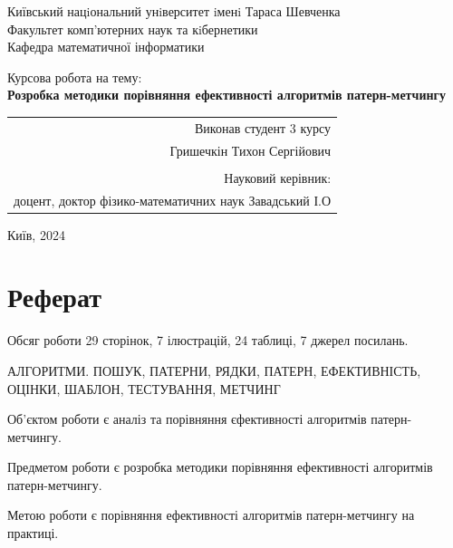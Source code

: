 \documentclass[a4paper,14pt]{extarticle} %
\begin{document}
	

    \begin{titlepage}
        \centering
        \large
        Київський нацiональний унiверситет iменi Тараса Шевченка\\
        Факультет комп’ютерних наук та кiбернетики\\
        Кафедра математичної інформатики\\
        
        \vspace*{4cm}
        
        \huge Курсова робота на тему: \\
            \textbf{Розробка методики порівняння ефективності алгоритмів патерн-метчингу}
        
        \vspace{4cm}
        
        \raggedleft
        \large
        \begin{tabular}{r}
            Виконав студент 3 курсу \\
            Гришечкін Тихон Сергійович \\
            \\
            Науковий керівник: \\
            доцент, доктор фізико-математичних наук Завадський І.О \\
        \end{tabular}
        
        \vfill
        
        \centering
        \large
        Київ, 2024
        
    \end{titlepage}

	
	\newpage

	\section*{Реферат}

	Обсяг роботи 29 сторінок, 7 ілюстрацій, 24 таблиці, 7 джерел посилань.

	АЛГОРИТМИ. ПОШУК, ПАТЕРНИ, РЯДКИ, ПАТЕРН,
	ЕФЕКТИВНІСТЬ, ОЦІНКИ, ШАБЛОН, ТЕСТУВАННЯ, МЕТЧИНГ

	Об'єктом роботи є аналіз та порівняння єфективності алгоритмів патерн-метчингу.
	
	Предметом роботи є розробка методики порівняння ефективності алгоритмів патерн-метчингу.

	Метою роботи є порівняння ефективності алгоритмів патерн-метчингу на практиці. 
\end{document}
